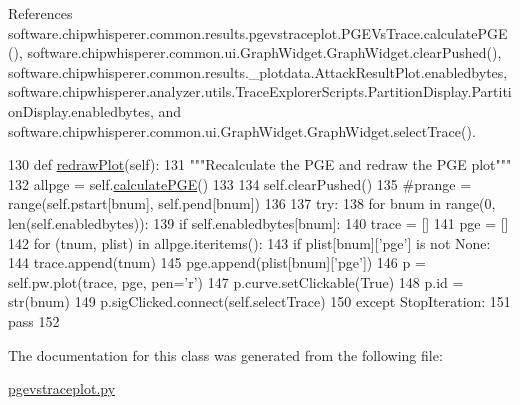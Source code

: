 References software.\+chipwhisperer.\+common.\+results.\+pgevstraceplot.\+P\+G\+E\+Vs\+Trace.\+calculate\+P\+G\+E(), software.\+chipwhisperer.\+common.\+ui.\+Graph\+Widget.\+Graph\+Widget.\+clear\+Pushed(), software.\+chipwhisperer.\+common.\+results.\+\_\+plotdata.\+Attack\+Result\+Plot.\+enabledbytes, software.\+chipwhisperer.\+analyzer.\+utils.\+Trace\+Explorer\+Scripts.\+Partition\+Display.\+Partition\+Display.\+enabledbytes, and software.\+chipwhisperer.\+common.\+ui.\+Graph\+Widget.\+Graph\+Widget.\+select\+Trace().


\begin{DoxyCode}
130     \textcolor{keyword}{def }\hyperlink{classsoftware_1_1chipwhisperer_1_1common_1_1results_1_1pgevstraceplot_1_1PGEVsTrace_a7da78636d231527f48261ddf2a4410ba}{redrawPlot}(self):
131         \textcolor{stringliteral}{"""Recalculate the PGE and redraw the PGE plot"""}
132         allpge = self.\hyperlink{classsoftware_1_1chipwhisperer_1_1common_1_1results_1_1pgevstraceplot_1_1PGEVsTrace_ad1074cc8b19ffa1cc7cc156b4d7799f9}{calculatePGE}()
133 
134         self.clearPushed()
135         \textcolor{comment}{#prange = range(self.pstart[bnum], self.pend[bnum])}
136 
137         \textcolor{keywordflow}{try}:
138             \textcolor{keywordflow}{for} bnum \textcolor{keywordflow}{in} range(0, len(self.enabledbytes)):
139                 \textcolor{keywordflow}{if} self.enabledbytes[bnum]:
140                     trace = []
141                     pge = []
142                     \textcolor{keywordflow}{for} (tnum, plist) \textcolor{keywordflow}{in} allpge.iteritems():
143                         \textcolor{keywordflow}{if} plist[bnum][\textcolor{stringliteral}{'pge'}] \textcolor{keywordflow}{is} \textcolor{keywordflow}{not} \textcolor{keywordtype}{None}:
144                             trace.append(tnum)
145                             pge.append(plist[bnum][\textcolor{stringliteral}{'pge'}])
146                     p = self.pw.plot(trace, pge, pen=\textcolor{stringliteral}{'}\textcolor{stringliteral}{r')}
147 \textcolor{stringliteral}{                    p.curve.setClickable(}\textcolor{keyword}{True})
148                     p.id = str(bnum)
149                     p.sigClicked.connect(self.selectTrace)
150         \textcolor{keywordflow}{except} StopIteration:
151             \textcolor{keywordflow}{pass}
152 \end{DoxyCode}


The documentation for this class was generated from the following file\+:\begin{DoxyCompactItemize}
\item 
\hyperlink{pgevstraceplot_8py}{pgevstraceplot.\+py}\end{DoxyCompactItemize}
